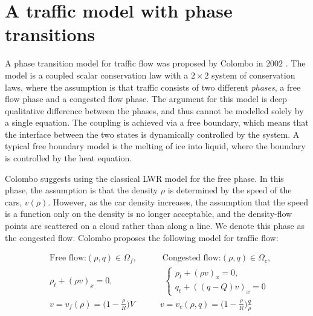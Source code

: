 \documentclass{article}
\numberwithin{equation}{section}
\begin{document}
\section{A traffic model with phase transitions}
A phase transition model for traffic flow was proposed by Colombo in $2002$ \cite{Colombo2003}. The model is a coupled scalar conservation law with a $2 \times 2$ system of conservation laws, where the assumption is that traffic consists of two different \textit{phases}, a free flow phase and a congested flow phase. The argument for this model is deep qualitative difference between the phases, and thus cannot be modelled solely by a single equation. The coupling is achieved via a free boundary, which means that the interface between the two states is dynamically controlled by the system. A typical free boundary model is the melting of ice into liquid, where the boundary is controlled by the heat equation. 

Colombo suggests using the classical LWR model for the free phase. In this phase, the assumption is that the density $\rho$ is determined by the speed of the cars, $v(\rho)$. However, as the car density increases, the assumption that the speed is a function only on the density is no longer acceptable, and the density-flow points are scattered on a cloud rather than along a line. We denote this phase as the congested flow. 
Colombo proposes the following model for traffic flow: 

\begin{align}
    & \text{Free flow:}  (\rho, q) \in \Omega_f, \quad \quad \quad \text{Congested flow:} (\rho, q) \in \Omega_c, \\
    & \rho_t + (\rho v )_x = 0, \quad \quad   \quad \quad \quad \quad 
    \begin{cases}
    \rho_t + (\rho v )_x = 0 , \\
    q_t + ((q-Q)v)_x = 0 
    \end{cases} \\
    & v = v_f(\rho) = \big(1- \frac{\rho}{R}\big)V \quad \quad \quad v = v_c(\rho,q) = \big(1 - \frac{\rho}{R}\big)\frac{q}{\rho}
    \label{Eq:phase-transition}
\end{align}
\end{document}
